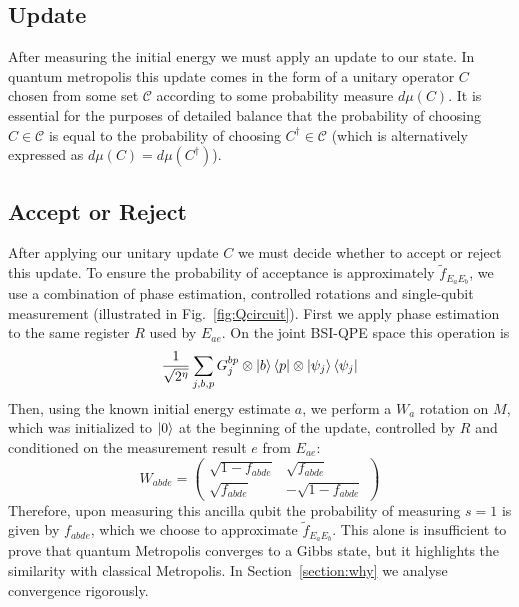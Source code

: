 \documentclass[aps,floatfix,10pt,amssymb,amsfont,amsmath,superscriptaddress,float,nofootinbib,longbibliography,nobalancelastpage,twocolumn]{revtex4-2}
\begin{document}
\subsection{Update}
\label{section:update}
After measuring the initial energy we must apply an update to our state. In quantum metropolis this update comes in the form of a unitary operator $C$ chosen from some set $\mathcal{C}$ according to some probability measure $d\mu(C)$. It is essential for the purposes of detailed balance that the probability of choosing $C \in \mathcal{C}$ is equal to the probability of choosing $C^{\dagger} \in \mathcal{C}$ (which is alternatively expressed as $d\mu(C) = d\mu(C^{\dagger})$).
\subsection{Accept or Reject}
\label{section:acceptprob}
After applying our unitary update $C$ we must decide whether to accept or reject this update. To ensure the probability of acceptance is approximately $\tilde{f}_{E_aE_b}$, we use a combination of phase estimation, controlled rotations and single-qubit measurement (illustrated in Fig.~\ref{fig:Qcircuit}). First we apply phase estimation to the same register $R$ used by $E_{ae}$. On the joint BSI-QPE space this operation is
\begin{equation}
   \frac{1}{\sqrt{2^{\eta}}}\sum_{j,b,p}G_j^{bp}\otimes\ket{b}\bra{p}\otimes\ket{\psi_j}\bra{\psi_j}
\end{equation}
Then, using the known initial energy estimate $a$, we perform a $W_a$ rotation on $M$, which was initialized to $\ket{0}$ at the beginning of the update, controlled by $R$ and conditioned on the measurement result $e$ from $E_{ae}$:
\begin{equation}
    W_{abde} = \begin{pmatrix}
        \sqrt{1 - f_{abde}} & \sqrt{f_{abde}}\\
       \sqrt{f_{abde}} & -\sqrt{1 - f_{abde}}
    \end{pmatrix}
\end{equation}
Therefore, upon measuring this ancilla qubit the probability of measuring $s=1$ is given by $f_{abde}$, which we choose to approximate $\tilde f_{E_aE_b}$. This alone is insufficient to prove that quantum Metropolis converges to a Gibbs state, but it highlights the similarity with classical Metropolis. In Section~\ref{section:why} we analyse convergence rigorously.
\end{document}
